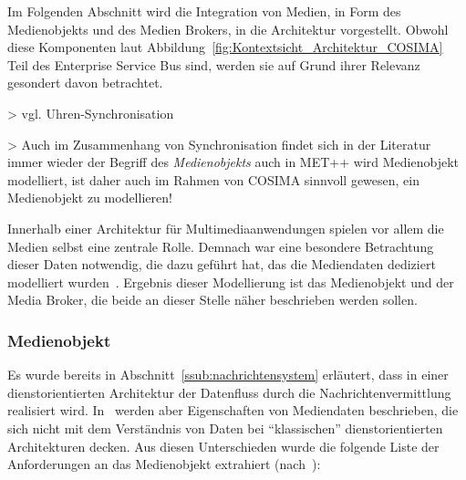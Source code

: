   Im Folgenden Abschnitt wird die Integration von Medien, in Form des Medienobjekts und des Medien Brokers, in die Architektur vorgestellt. Obwohl diese Komponenten laut Abbildung~\ref{fig:Kontextsicht_Architektur_COSIMA} Teil des Enterprise Service Bus sind, werden sie auf Grund ihrer Relevanz gesondert davon betrachtet.
  
  > vgl. Uhren-Synchronisation~\citep[S. 610]{multimedia_technologie}


  > Auch im Zusammenhang von Synchronisation findet sich in der Literatur immer wieder der Begriff des \emph{Medienobjekts} auch in MET++ wird Medienobjekt modelliert, ist daher auch im Rahmen von COSIMA sinnvoll gewesen, ein Medienobjekt zu modellieren!
  
  Innerhalb einer Architektur für Multimediaanwendungen spielen vor allem die Medien selbst eine zentrale Rolle. Demnach war eine besondere Betrachtung dieser Daten notwendig, die dazu geführt hat, das die Mediendaten dediziert modelliert wurden~\citep{bericht}. Ergebnis dieser Modellierung ist das Medienobjekt und der Media Broker, die beide an dieser Stelle näher beschrieben werden sollen.
  
\subsubsection{Medienobjekt} %
\label{ssub:medienobjekt}

  Es wurde bereits in Abschnitt~\ref{ssub:nachrichtensystem} erläutert, dass in einer dienstorientierten Architektur der Datenfluss durch die Nachrichtenvermittlung realisiert wird. In~\citep[S. 27ff]{bericht} werden aber Eigenschaften von Mediendaten beschrieben, die sich nicht mit dem Verständnis von Daten bei "`klassischen"' dienstorientierten Architekturen decken. Aus diesen Unterschieden wurde die folgende Liste der Anforderungen an das Medienobjekt extrahiert (nach~\citep{bericht}):
  
